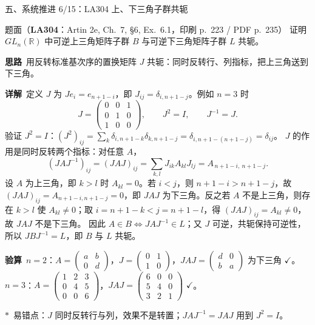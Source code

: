 \documentclass[aspectratio=169,10pt,fontset=none]{ctexbeamer}
\newcommand{\ex}[1]{\textcolor{accent}{\footnotesize\bfseries #1}}
\newcommand{\key}[1]{\textcolor{ink}{\bfseries #1}}
\newcommand{\starpt}{\textcolor{accent}{\bfseries$\ast$}}
\begin{document}
\begin{frame}[t]{五、系统推进 6/15：LA304 上、下三角子群共轭}
\label{ex:LA304}
\scriptsize
\begin{block}{\footnotesize 题面（\ex{LA304}：Artin 2e, Ch.~7, \S6, Ex.~6.1，印刷 p.~223 / PDF p.~235）}
证明 $GL_n(\mathbb R)$ 中可逆上三角矩阵子群 $B$ 与可逆下三角矩阵子群 $L$ 共轭。
\end{block}
\vspace{-1.0mm}
\key{思路}\ 用反转标准基次序的置换矩阵 $J$ 共轭：同时反转行、列指标，把上三角送到下三角。

\key{详解}\ 定义 $J$ 为 $Je_i=e_{n+1-i}$，即 $J_{ij}=\delta_{i,n+1-j}$。例如 $n=3$ 时
\[
J=\begin{pmatrix}0&0&1\\0&1&0\\1&0&0\end{pmatrix},\qquad J^2=I,\qquad J^{-1}=J.
\]
验证 $J^2=I$：$(J^2)_{ij}=\sum_k \delta_{i,n+1-k}\delta_{k,n+1-j}=\delta_{i,n+1-(n+1-j)}=\delta_{ij}$。
$J$ 的作用是同时反转两个指标：对任意 $A$，
\[
(JAJ^{-1})_{ij}=(JAJ)_{ij}=\sum_{k,l}J_{ik}A_{kl}J_{lj}=A_{\,n+1-i,\ n+1-j}.
\]
设 $A$ 为上三角，即 $k>l$ 时 $A_{kl}=0$。若 $i<j$，则 $n+1-i>n+1-j$，故 $(JAJ)_{ij}=A_{n+1-i,n+1-j}=0$，即 $JAJ$ 为下三角。反之若 $A$ 不是上三角，则存在 $k>l$ 使 $A_{kl}\ne0$；取 $i=n+1-k<j=n+1-l$，得 $(JAJ)_{ij}=A_{kl}\ne0$，故 $JAJ$ 不是下三角。
因此 $A\in B\iff JAJ^{-1}\in L$；又 $J$ 可逆，共轭保持可逆性，所以 $JBJ^{-1}=L$，即 $B$ 与 $L$ 共轭。

\key{验算}\ $n=2$：$A=\begin{pmatrix}a&b\\0&d\end{pmatrix}$，$J=\begin{pmatrix}0&1\\1&0\end{pmatrix}$，$JAJ=\begin{pmatrix}d&0\\b&a\end{pmatrix}$ 为下三角 $\checkmark$。$n=3$：$A=\begin{pmatrix}1&2&3\\0&4&5\\0&0&6\end{pmatrix}$，$JAJ=\begin{pmatrix}6&0&0\\5&4&0\\3&2&1\end{pmatrix}$ $\checkmark$。

\starpt\ 易错点：$J$ 同时反转行与列，效果不是转置；$JAJ^{-1}=JAJ$ 用到 $J^2=I$。
\end{frame}
\end{document}
